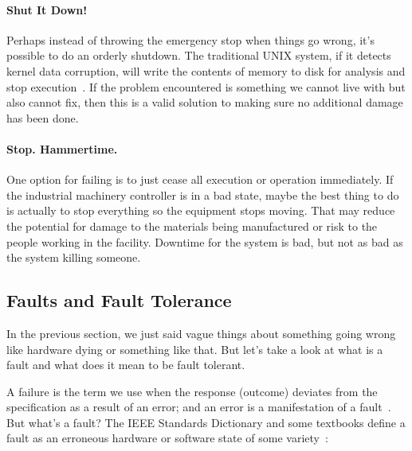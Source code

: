 \paragraph{Shut It Down!} Perhaps instead of throwing the emergency stop when things go wrong, it's possible to do an orderly shutdown. The traditional UNIX system, if it detects kernel data corruption, will write the contents of memory to disk for analysis and stop execution~\cite{osi}. If the problem encountered is something we cannot live with but also cannot fix, then this is a valid solution to making sure no additional damage has been done.

\paragraph{Stop. Hammertime.} One option for failing is to just cease all execution or operation immediately. If the industrial machinery controller is in a bad state, maybe the best thing to do is actually to stop everything so the equipment stops moving. That may reduce the potential for damage to the materials being manufactured or risk to the people working in the facility. Downtime for the system is bad, but not as bad as the system killing someone.

\subsection*{Faults and Fault Tolerance}
In the previous section, we just said vague things about something going wrong like hardware dying or something like that. But let's take a look at what is a fault and what does it mean to be fault tolerant.

A failure is the term we use when the response (outcome) deviates from the specification as a result of an error; and an error is a manifestation of a fault~\cite{mte241}. But what's a fault? The IEEE Standards Dictionary and some textbooks define a fault as an erroneous hardware or software state of some variety~\cite{osi}:

